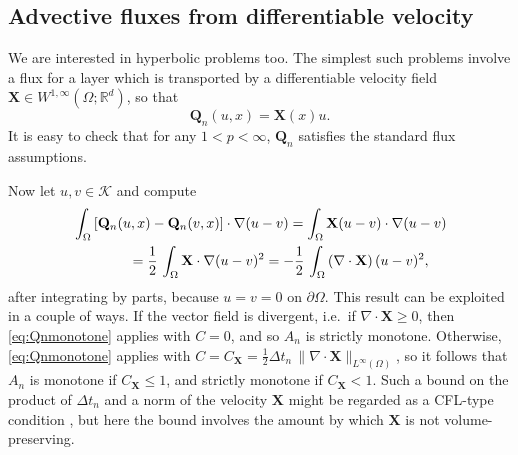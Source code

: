\documentclass[final,leqno,onefignum,onetabnum]{siamltex1213bueler}
\newcommand\bQ{\mathbf{Q}}
\newcommand\bX{\mathbf{X}}
\newcommand{\Div}{\nabla\cdot}
\renewcommand{\grad}{\nabla}
\newcommand\RR{\mathbb{R}}
\begin{document}
\subsection{Advective fluxes from differentiable velocity} \label{subsec:advect}  We are interested in hyperbolic problems too.  The simplest such problems involve a flux for a layer which is transported by a differentiable velocity field $\bX \in W^{1,\infty}(\Omega;\RR^d)$, so that
\begin{equation}
  \bQ_n(u,x) = \bX(x) u. \label{eq:advectflux}
\end{equation}
It is easy to check that for any $1<p<\infty$, $\bQ_n$ satisfies the standard flux assumptions.

Now let $u,v\in\mathcal{K}$ and compute
\begin{align}
   &\int_\Omega \left[\bQ_n(u,x) - \bQ_n(v,x)\right] \cdot \grad (u - v) = \int_\Omega \bX (u-v) \cdot \grad (u - v)   \label{eq:advectQnmono} \\
   &\qquad\qquad = \frac{1}{2}\,\int_\Omega \bX \cdot \grad (u - v)^2 = - \frac{1}{2}\,\int_\Omega \left(\Div\bX\right) (u - v)^2, \notag
\end{align}
after integrating by parts, because $u=v=0$ on $\partial \Omega$.  This result can be exploited in a couple of ways.  If the vector field is divergent, i.e.~if $\Div\bX\ge 0$, then \eqref{eq:Qnmonotone} applies with $C=0$, and so $A_n$ is strictly monotone.  Otherwise, \eqref{eq:Qnmonotone} applies with $C = C_\bX = \frac{1}{2}\Delta t_n\,\|\Div\bX\|_{L^\infty(\Omega)}$, so it follows that $A_n$ is monotone if $C_\bX \le 1$, and strictly monotone if $C_\bX < 1$.  Such a bound on the product of $\Delta t_n$ and a norm of the velocity $\bX$ might be regarded as a CFL-type condition \cite{LeVeque2002}, but here the bound involves the amount by which $\bX$ is not volume-preserving.
\end{document}
